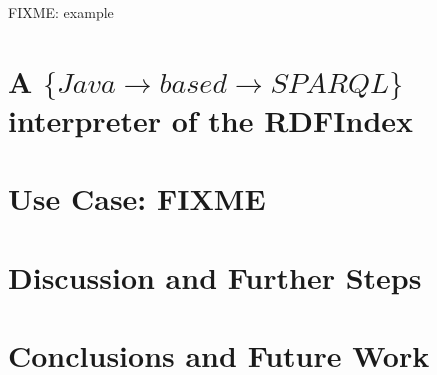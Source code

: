\documentclass{llncs}
\begin{document}
FIXME: example

\section{A $\{Java\rightarrow based \rightarrow SPARQL\}$  interpreter of the RDFIndex}
%
\section{Use Case: FIXME}
\section{Discussion and Further Steps}

\section{Conclusions and Future Work}



\end{document}
